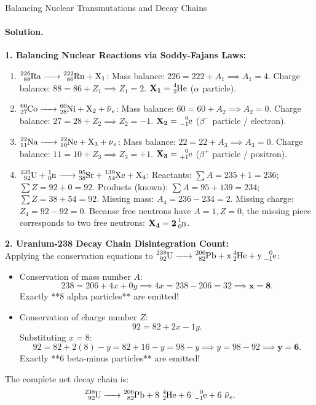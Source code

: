 \begin{workedexample}{Balancing Nuclear Transmutations and Decay Chains}
\paragraph{Solution.}
\textbf{1. Balancing Nuclear Reactions via Soddy-Fajans Laws:}\\
\begin{enumerate}[leftmargin=1.2em,itemsep=3pt]
  \item $\ce{^{226}_{88}Ra -> ^{222}_{86}Rn + X_1}$:
  Mass balance: $226 = 222 + A_1 \implies A_1 = 4$.
  Charge balance: $88 = 86 + Z_1 \implies Z_1 = 2$.
  $\mathbf{X_1 = \ce{^4_2He}}$ ($\alpha$ particle).
  \item $\ce{^{60}_{27}Co -> ^{60}_{28}Ni + X_2 + \bar{\nu}_e}$:
  Mass balance: $60 = 60 + A_2 \implies A_2 = 0$.
  Charge balance: $27 = 28 + Z_2 \implies Z_2 = -1$.
  $\mathbf{X_2 = \ce{^0_{-1}e}}$ ($\beta^-$ particle / electron).
  \item $\ce{^{22}_{11}Na -> ^{22}_{10}Ne + X_3 + \nu_e}$:
  Mass balance: $22 = 22 + A_3 \implies A_3 = 0$.
  Charge balance: $11 = 10 + Z_3 \implies Z_3 = +1$.
  $\mathbf{X_3 = \ce{^0_{+1}e}}$ ($\beta^+$ particle / positron).
  \item $\ce{^{235}_{92}U + ^1_0n -> ^{95}_{38}Sr + ^{139}_{54}Xe + X_4}$:
  Reactants: $\sum A = 235 + 1 = 236$; $\sum Z = 92 + 0 = 92$.
  Products (known): $\sum A = 95 + 139 = 234$; $\sum Z = 38 + 54 = 92$.
  Missing mass: $A_4 = 236 - 234 = 2$. Missing charge: $Z_4 = 92 - 92 = 0$.
  Because free neutrons have $A = 1, Z = 0$, the missing piece corresponds to two free neutrons:
  $\mathbf{X_4 = 2\,\ce{^1_0n}}$.
\end{enumerate}

\textbf{2. Uranium-238 Decay Chain Disintegration Count:}\\
Applying the conservation equations to $\ce{^{238}_{92}U -> ^{206}_{82}Pb + x\,^4_2He + y\,^0_{-1}e}$:
\begin{itemize}[leftmargin=1.5em,itemsep=2pt]
  \item Conservation of mass number $A$:
  \[
  238 = 206 + 4x + 0y \implies 4x = 238 - 206 = 32 \implies \mathbf{x = 8}.
  \]
  Exactly **$8$ alpha particles** are emitted!
  \item Conservation of charge number $Z$:
  \[
  92 = 82 + 2x - 1y.
  \]
  Substituting $x = 8$:
  \[
  92 = 82 + 2(8) - y = 82 + 16 - y = 98 - y \implies y = 98 - 92 \implies \mathbf{y = 6}.
  \]
  Exactly **$6$ beta-minus particles** are emitted!
\end{itemize}
The complete net decay chain is:
\[
\ce{^{238}_{92}U -> ^{206}_{82}Pb + 8\,^4_2He + 6\,^0_{-1}e + 6\,\bar{\nu}_e}.
\]
\end{workedexample}

